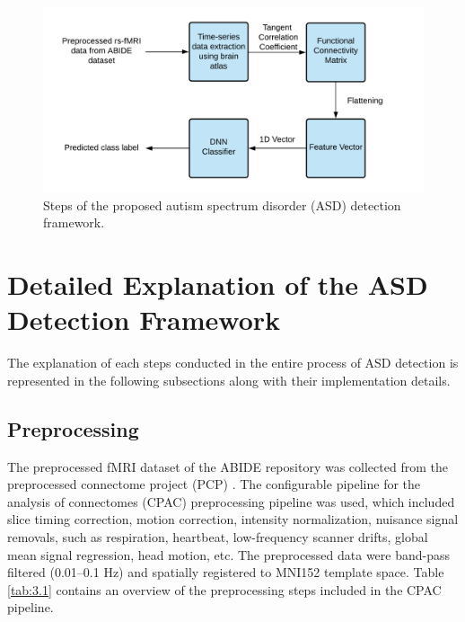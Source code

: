 \begin{figure}[h]
\centering
\includegraphics[width=\textwidth]{figures/Figure 3.1.png}
\caption{Steps of the proposed autism spectrum disorder (ASD) detection framework.}
\label{fig:3.1}
\end{figure}

\section{Detailed Explanation of the ASD Detection Framework}

The explanation of each steps conducted in the entire process of ASD detection is represented in the following subsections along with their implementation details.\\

\subsection{Preprocessing}
The preprocessed fMRI dataset of the ABIDE repository \cite{di2014autism, abide} was collected from the preprocessed connectome project (PCP) \cite{craddock2013neuro}. The configurable pipeline for the analysis of connectomes (CPAC) preprocessing pipeline was used, which included slice timing correction, motion correction, intensity normalization, nuisance signal removals, such as respiration, heartbeat, low-frequency scanner drifts, global mean signal regression, head motion, etc. The preprocessed data were band-pass filtered (0.01–0.1 Hz) and spatially registered to MNI152 template space. Table \ref{tab:3.1} contains an overview of the preprocessing steps included in
the CPAC pipeline.\\

